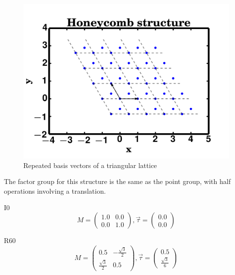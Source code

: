 \documentclass[12pt, fleqn]{article}
\begin{document}
\begin{figure}[h]
    \begin{center}
        \includegraphics[max width=\textwidth]{./honeycomb.png}
    \end{center}
    \caption{Repeated basis vectors of a triangular lattice}
    \label{fig:honey}
\end{figure}

The factor group for this structure is the same as the point group, with half operations involving a translation.

I0
\begin{equation}
    M=
    \begin{pmatrix}
        1.0&0.0\\
        0.0&1.0
    \end{pmatrix}
    ,\vec{\tau}=
    \begin{pmatrix}
        0.0\\
        0.0
    \end{pmatrix}
    \label{I0}
\end{equation}

R60
\begin{equation}
    M=
    \begin{pmatrix}
        0.5&-\frac{\sqrt{3}}{2}\\
        \frac{\sqrt{3}}{2}&0.5
    \end{pmatrix}
    ,\vec{\tau}=
    \begin{pmatrix}
        0.5\\
        \frac{\sqrt{3}}{6}
    \end{pmatrix}
    \label{R60}
\end{equation}
\end{document}
